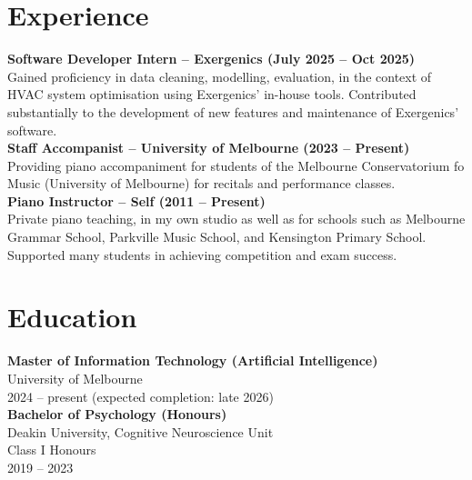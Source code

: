 \documentclass[a4paper,10pt]{article}
\begin{document}
\section*{\Large Experience}

\noindent\textbf{Software Developer Intern -- Exergenics (July 2025 -- Oct 2025)} \\
Gained proficiency in data cleaning, modelling, evaluation, in the context of HVAC system optimisation using Exergenics' in-house tools. Contributed substantially to the development of new features and maintenance of Exergenics' software. \\

\noindent\textbf{Staff Accompanist -- University of Melbourne (2023 -- Present)} \\
Providing piano accompaniment for students of the Melbourne Conservatorium fo Music (University of Melbourne) for recitals and performance classes.  \\

\noindent\textbf{Piano Instructor -- Self (2011 -- Present)} \\
Private piano teaching, in my own studio as well as for schools such as Melbourne Grammar School, Parkville Music School, and Kensington Primary School. Supported many students in achieving competition and exam success. 

\section*{\Large Education}
\textbf{Master of Information Technology (Artificial Intelligence)} \\
University of Melbourne \\
2024 -- present (expected completion: late 2026) \\

\noindent\textbf{Bachelor of Psychology (Honours)} \\
Deakin University, Cognitive Neuroscience Unit \\
Class I Honours \\
2019 -- 2023 \\
\end{document}
